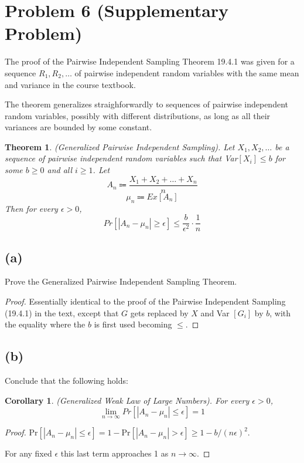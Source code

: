 \documentclass[14pt]{extarticle}
\newtheorem{thm}{Theorem}
\newtheorem{corol}{Corollary}
\begin{document}
\section{Problem 6 (Supplementary Problem)}
The proof of the Pairwise Independent Sampling Theorem 19.4.1 was given for a sequence $R_1,R_2,\ldots$ of pairwise independent random variables with the same mean and variance in the course textbook.

The theorem generalizes straighforwardly to sequences of pairwise independent random variables, possi­bly with different distributions, as long as all their variances are bounded by some constant.

\begin{thm}
(Generalized Pairwise Independent Sampling). Let $X_1, X_2,\ldots$ be a sequence of pairwise inde­pendent random variables such that Var$[X_i] \leq b$ for some $b \geq 0$ and all $i \geq 1$. Let
$$
A_n \Coloneqq \frac{X_1 + X_2 + \ldots + X_n}{n}
$$
$$
\mu_n \Coloneqq Ex[A_n]
$$
Then for every $\epsilon > 0$,
$$
Pr[|A_n - \mu_n| \geq \epsilon] \leq \frac{b}{\epsilon^2} \cdot \frac{1}{n}
$$
\end{thm}

\subsection{(a)}
Prove the Generalized Pairwise Independent Sampling Theorem.

\begin{proof}
Essentially identical to the proof of the Pairwise Independent Sampling (19.4.1) in the text, except that $G$ gets re­placed by $X$ and Var $[G_i]$ by $b$, with the equality where the $b$ is first used becoming $\leq$.
\end{proof}

\subsection{(b)}
Conclude that the following holds:
\begin{corol}
(Generalized Weak Law of Large Numbers). For every $\epsilon > 0$,
$$
\lim_{n \to \infty} Pr[|A_n - \mu_n| \leq \epsilon] = 1
$$
\end{corol}

\begin{proof}
Pr$[|A_n - \mu_n| \leq \epsilon] = 1 - $Pr$[|A_n - \mu_n| > \epsilon] \geq 1 - b/(n\epsilon)^2$.

For any fixed $\epsilon$ this last term approaches 1 as $n \to \infty$.
\end{proof}
\end{document}
